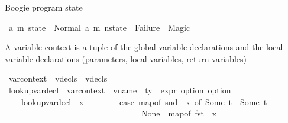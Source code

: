 \begin{isabellebody}
\begin{isamarkuptext}%
Boogie program state%
\end{isamarkuptext}\isamarkuptrue%
\isamarkupfalse%
\ {\isacharparenleft}{\kern0pt}{\isacharprime}{\kern0pt}a{\isacharcomma}{\kern0pt}\ {\isacharprime}{\kern0pt}m{\isacharparenright}{\kern0pt}\ state\ {\isacharequal}{\kern0pt}\ Normal\ {\isachardoublequoteopen}{\isacharparenleft}{\kern0pt}{\isacharprime}{\kern0pt}a{\isacharcomma}{\kern0pt}\ {\isacharprime}{\kern0pt}m{\isacharparenright}{\kern0pt}\ nstate{\isachardoublequoteclose}\ {\isacharbar}{\kern0pt}\ Failure\ {\isacharbar}{\kern0pt}\ Magic%
\begin{isamarkuptext}%
A variable context is a tuple of the global variable declarations and the local variable 
declarations (parameters, local variables, return variables)%
\end{isamarkuptext}\isamarkuptrue%
\isamarkupfalse%
\ var{\isacharunderscore}{\kern0pt}context\ {\isacharequal}{\kern0pt}\ {\isachardoublequoteopen}vdecls\ {\isasymtimes}\ vdecls{\isachardoublequoteclose}%
\isadelimdocument
%
\endisadelimdocument
%
\isatagdocument
%
\isamarkuptrue%
%
\endisatagdocument
{\isafolddocument}%
%
\isadelimdocument
%
\endisadelimdocument
{}\isamarkupfalse%
\ lookup{\isacharunderscore}{\kern0pt}var{\isacharunderscore}{\kern0pt}decl\ {\isacharcolon}{\kern0pt}{\isacharcolon}{\kern0pt}\ {\isachardoublequoteopen}var{\isacharunderscore}{\kern0pt}context\ {\isasymRightarrow}\ vname\ {\isasymRightarrow}\ {\isacharparenleft}{\kern0pt}ty\ {\isasymtimes}\ expr\ option{\isacharparenright}{\kern0pt}\ option{\isachardoublequoteclose}\isanewline
\ \ \ \isanewline
\ \ \ \ {\isachardoublequoteopen}lookup{\isacharunderscore}{\kern0pt}var{\isacharunderscore}{\kern0pt}decl\ {\isasymLambda}\ x\ {\isacharequal}{\kern0pt}\ \isanewline
\ \ \ \ \ \ {\isacharparenleft}{\kern0pt}case\ {\isacharparenleft}{\kern0pt}map{\isacharunderscore}{\kern0pt}of\ {\isacharparenleft}{\kern0pt}snd\ {\isasymLambda}{\isacharparenright}{\kern0pt}\ x{\isacharparenright}{\kern0pt}\ of\ Some\ t\ {\isasymRightarrow}\ Some\ t\ {\isacharbar}{\kern0pt}\isanewline
\ \ \ \ \ \ \ \ \ \ \ \ \ \ \ \ \ \ \ \ \ \ \ \ \ \ \ \ \ \ \ \ \ None\ {\isasymRightarrow}\ map{\isacharunderscore}{\kern0pt}of\ {\isacharparenleft}{\kern0pt}fst\ {\isasymLambda}{\isacharparenright}{\kern0pt}\ x{\isacharparenright}{\kern0pt}{\isachardoublequoteclose}%

\end{isabellebody}
